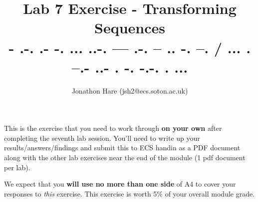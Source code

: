 \documentclass[a4paper]{article}
\begin{document}
\lstset{language=Python,upquote=true}

\setlength{\leftskip}{20pt}
\title{Lab 7 Exercise - Transforming Sequences\\- .-. .- -. ... ..-. --- .-. -- .. -. --. / ... . --.- ..- . -. -.-. . ...}
\author{Jonathon Hare (jsh2@ecs.soton.ac.uk)}

\maketitle


This is the exercise that you need to work through \textbf{on your own} after completing the seventh lab session. You'll need to write up your results/answers/findings and submit this to ECS handin as a PDF document along with the other lab exercises near the end of the module (1 pdf document per lab). 

We expect that you \textbf{will use no more than one side} of A4 to cover your responses to \emph{this} exercise. This exercise is worth 5\% of your overall module grade.
\end{document}
